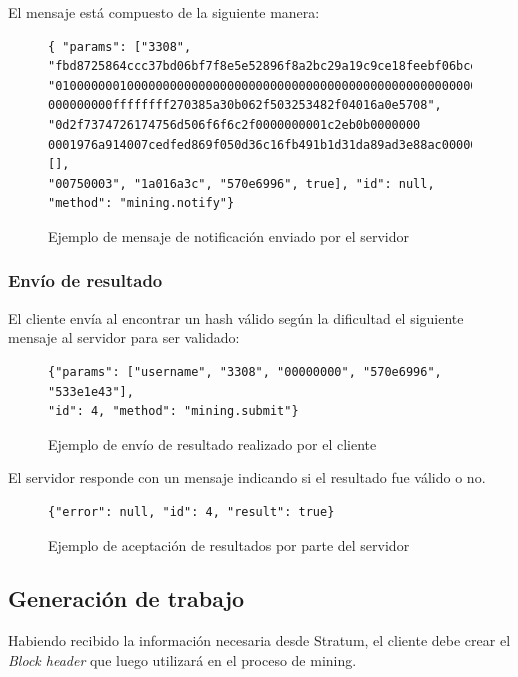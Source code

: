 \documentclass[a4paper, 10pt, twoside]{article}
\begin{document}
El mensaje está compuesto de la siguiente manera:

\begin{figure}[H]
\centering
\begin{lstlisting}
{ "params": ["3308", 
"fbd8725864ccc37bd06bf7f8e5e52896f8a2bc29a19c9ce18feebf06bcedfb66",
"01000000010000000000000000000000000000000000000000000000000000000
000000000ffffffff270385a30b062f503253482f04016a0e5708",
"0d2f7374726174756d506f6f6c2f0000000001c2eb0b0000000
0001976a914007cedfed869f050d36c16fb491b1d31da89ad3e88ac00000000",
[],
"00750003", "1a016a3c", "570e6996", true], "id": null, "method": "mining.notify"}
\end{lstlisting}
\caption{Ejemplo de mensaje de notificación enviado por el servidor}
\end{figure}

\subsubsection{Envío de resultado}

El cliente envía al encontrar un hash válido según la dificultad el siguiente mensaje al servidor para ser validado:

\begin{figure}[H]
\centering
\begin{lstlisting}
{"params": ["username", "3308", "00000000", "570e6996", "533e1e43"], 
"id": 4, "method": "mining.submit"}
\end{lstlisting}
\caption{Ejemplo de envío de resultado realizado por el cliente}
\end{figure}


El servidor responde con un mensaje indicando si el resultado fue válido o no.

\begin{figure}[H]
\centering
\begin{lstlisting}
{"error": null, "id": 4, "result": true}
\end{lstlisting}
\caption{Ejemplo de aceptación de resultados por parte del servidor}
\end{figure}

\subsection{Generación de trabajo}

Habiendo recibido la información necesaria desde Stratum, el cliente debe crear el \textit{Block header} 
que luego utilizará en el proceso de mining.
\end{document}
